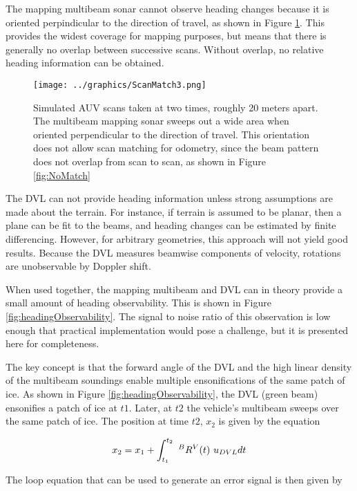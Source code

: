 The mapping multibeam sonar cannot observe heading changes because it is oriented perpindicular to the direction of travel, as shown in Figure \ref{fig:beamOrientation}. This provides the widest coverage for mapping purposes, but means that there is generally no overlap between successive scans. Without overlap, no relative heading information can be obtained. 

\begin{figure}[h]
   \centering
   \texttt{[image: ../graphics/ScanMatch3.png]} %
   \caption{Simulated AUV scans taken at two times, roughly 20 meters apart. The multibeam mapping sonar sweeps out a wide area when oriented perpendicular to the direction of travel. This orientation does not allow scan matching for odometry, since the beam pattern does not overlap from scan to scan, as shown in Figure \ref{fig:NoMatch}}
   \label{fig:beamOrientation}
\end{figure}

The DVL can not provide heading information unless strong assumptions are made about the terrain. For instance, if terrain is assumed to be planar, then a plane can be fit to the beams, and heading changes can be estimated by finite differencing. However, for arbitrary geometries, this approach will not yield good results. Because the DVL measures beamwise components of velocity, rotations are unobservable by Doppler shift. 

When used together, the mapping multibeam and DVL can in theory provide a small amount of heading observability. This is shown in Figure \ref{fig:headingObservability}. The signal to noise ratio of this observation is low enough that practical implementation would pose a challenge, but it is presented here for completeness.

The key concept is that the forward angle of the DVL and the high linear density of the multibeam soundings  enable multiple ensonifications of the same patch of ice. As shown in Figure \ref{fig:headingObservability}, the DVL (green beam) ensonifies a patch of ice at $t1$. Later, at $t2$ the vehicle's multibeam sweeps over the same patch of ice. The position at time $t2$, $x_2$ is given by the equation

\begin{align}
x_2 = x_1 + \int_{t_1}^{t_2}~^BR^V(t)~u_{\tiny{DVL}}dt
\end{align}

The loop equation that can be used to generate an error signal is then given by


